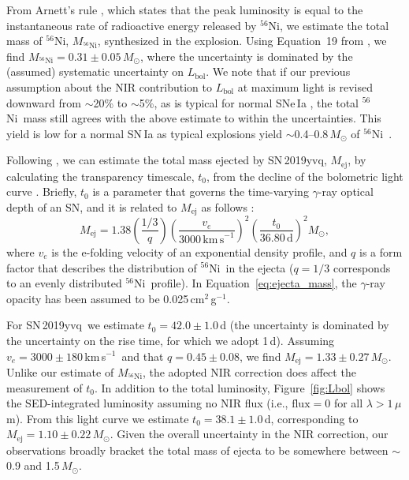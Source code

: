 \documentclass[twocolumn]{aastex63}
\newcommand{\kms}{km\,s$^{-1}$}
\newcommand{\radni}{$^{56}$Ni}
\newcommand{\sn}{SN\,2019yvq}
\begin{document}
From Arnett's rule \citep{Arnett82}, which states that the peak luminosity is
equal to the instantaneous rate of radioactive energy released by \radni, we
estimate the total mass of \radni, $M_\mathrm{^{56}Ni}$, synthesized in the
explosion. Using Equation~19 from \citet[][see also
\citealt{Stritzinger06,Howell09,Scalzo14}]{Nadyozhin94}, we find
$M_\mathrm{^{56}Ni} = 0.31 \pm 0.05\,M_\odot$, where the uncertainty is
dominated by the (assumed) systematic uncertainty on $L_\mathrm{bol}$. We note
that if our previous assumption about the NIR contribution to $L_\mathrm{bol}$
at maximum light is revised downward from $\sim$20\% to $\sim$5\%, as is
typical for normal SNe\,Ia \citep[e.g.,][]{Suntzeff96,Contardo00}, the total
\radni\ mass still agrees with the above estimate to within the uncertainties.
This yield is low for a normal SN\,Ia as typical explosions yield
$\sim$0.4--0.8\,$M_\odot$ of \radni~\citep[e.g.,][]{Scalzo14a}.

Following \citet{Jeffery99}, we can estimate the total mass ejected by
\sn, $M_\mathrm{ej}$, by calculating the transparency timescale, $t_0$, from
the decline of the bolometric light curve \citep[see
also][]{Stritzinger06,Scalzo14,Dhawan18}. Briefly, $t_0$ is a parameter that
governs the time-varying $\gamma$-ray optical depth of an SN, and it is related
to $M_\mathrm{ej}$ as follows \citep{Jeffery99,Dhawan18}:
%
\begin{equation}
    M_\mathrm{ej} = 1.38 \left(\frac{1/3}{q}\right)
    \left(\frac{v_e}{3000\,\mathrm{km\,s}^{-1}}\right)^2 
    \left(\frac{t_0}{36.80\,\mathrm{d}}\right)^2 M_\odot,
    \label{eq:ejecta_mass}
\end{equation}
%
where $v_e$ is the e-folding velocity of an exponential density profile, and
$q$ is a form factor that describes the distribution of \radni\ in the ejecta
($q = 1/3$ corresponds to an evenly distributed \radni\ profile). In
Equation~\ref{eq:ejecta_mass}, the $\gamma$-ray opacity has been assumed to be
0.025\,cm$^{2}$\,g$^{-1}$.

For \sn\ we estimate $t_0 = 42.0 \pm 1.0$\,d (the uncertainty is dominated by
the uncertainty on the rise time, for which we adopt 1\,d). Assuming $v_e =
3000 \pm 180$\,\kms\ and that $q = 0.45 \pm 0.08$, we find $M_\mathrm{ej} =
1.33 \pm 0.27\,M_\odot$. Unlike our estimate of $M_\mathrm{^{56}Ni}$, the
adopted NIR correction does affect the measurement of $t_0$. In addition to
the total luminosity, Figure~\ref{fig:Lbol} shows the SED-integrated
luminosity assuming no NIR flux (i.e., $\mathrm{flux} = 0$ for all $\lambda >
1\,\mu$m). From this light curve we estimate $t_0 = 38.1 \pm 1.0$\,d,
corresponding to $M_\mathrm{ej} = 1.10 \pm 0.22\,M_\odot$. Given the overall
uncertainty in the NIR correction, our observations broadly bracket the total
mass of ejecta to be somewhere between $\sim$0.9 and 1.5\,$M_\odot$.
\end{document}
